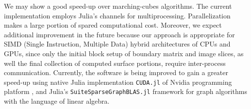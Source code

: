 \documentclass{article}
\begin{document}
We may show a good speed-up over marching-cubes algorithms. 
The current implementation employs Julia's channels
for multiprocessing. 
Parallelization makes a large portion of spared computational cost. 
%
Moreover, we expect additional improvement in the future because our approach is appropriate  for SIMD (Single Instruction, Multiple Data) hybrid architectures of CPUs and GPUs, since only the initial block setup of boundary matrix and image slices, as well the final collection of computed surface portions, require inter-process communication. 
Currently, the software is being improved to gain a greater
speed-up using native Julia implementation \texttt{CUDA.jl} of Nvidia programming platform 
\cite{Besard2019}
, and Julia's
\texttt{SuiteSparseGraphBLAS.jl} framework 
\cite{Buluc2017}
for graph algorithms with the language of linear algebra. 







 


\end{document}
